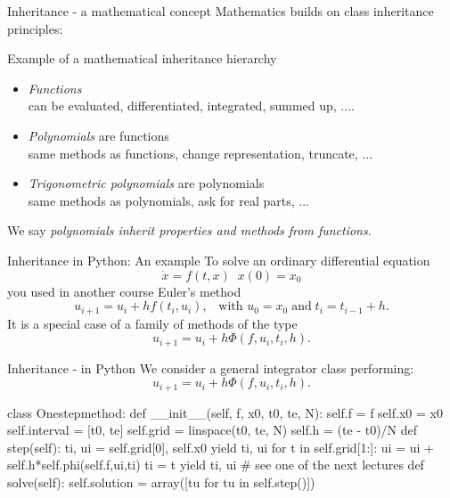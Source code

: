 \documentclass[hyperref={pdfpagelabels=false},table]{beamer}
\begin{document}
\begin{frame}[fragile]{Inheritance - a mathematical concept}
Mathematics builds on class inheritance principles:

\vfill

Example of a mathematical inheritance hierarchy

\begin{itemize}
\item {\em Functions} \\ {\small can be evaluated, differentiated, integrated, summed up, ....}
\item {\em Polynomials} are functions\\ {\small same methods as functions, change representation, truncate, ...}
\item {\em Trigonometric polynomials} are polynomials \\ {\small same methods as polynomials, ask for real parts, ...}
\end{itemize}
\vfill

We say {\it polynomials inherit properties and methods from functions}.
\end{frame}
\begin{frame}[fragile]{Inheritance in Python: An example}
\vfill
To solve an ordinary differential equation
\[
\dot x = f(t,x) \;\;x(0)=x_0
\]
you used in another course Euler's method
\[
 u_{i+1} = u_i + h f(t_i, u_i), \;\;\; \text{with } u_0=x_0\;\text{and}\;t_i=t_{i-1}+h .
\]
\vfill
It is a special case of a family of methods of the type
\[
 u_{i+1} = u_i + h \Phi(f,u_i,t_i,h) .
\]
\end{frame}
\begin{frame}[fragile]{Inheritance - in Python}
We consider a general integrator class performing:
\[
 u_{i+1} = u_i + h \Phi(f,u_i,t_i,h) .
\]
\begin{python}
class Onestepmethod:
  def __init__(self, f, x0, t0, te, N):
    self.f = f
    self.x0 = x0
    self.interval = [t0, te]
    self.grid = linspace(t0, te, N)
    self.h = (te - t0)/N
  def step(self):
    ti, ui = self.grid[0], self.x0
    yield ti, ui
    for t in self.grid[1:]:
      ui = ui + self.h*self.phi(self.f,ui,ti)
      ti = t
      yield ti, ui        # see one of the next lectures
  def solve(self):
    self.solution = array([tu for tu in self.step()])
\end{python}

\end{frame}
\end{document}
